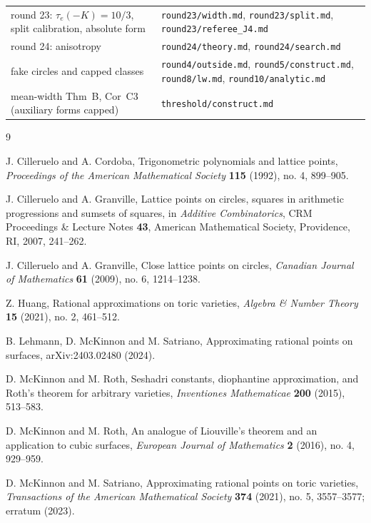 \documentclass[11pt]{article}
\newcommand{\rec}[1]{\texttt{#1}}
\begin{document}
\begin{center}
\begin{tabular}{@{}p{}p{}@{}}
round 23: \(\tau_e(-K)=10/3\), split calibration, absolute form &
  \rec{round23/width.md}, \rec{round23/split.md}, \rec{round23/referee\_J4.md} \\
round 24: anisotropy & \rec{round24/theory.md}, \rec{round24/search.md} \\
fake circles and capped classes &
  \rec{round4/outside.md}, \rec{round5/construct.md}, \rec{round8/lw.md},
  \rec{round10/analytic.md} \\
mean-width Thm~B, Cor~C3 (auxiliary forms capped) &
  \rec{threshold/construct.md} \\
\hline
\end{tabular}
\end{center}

\begin{thebibliography}{9}

J. Cilleruelo and A. Cordoba,
\newblock Trigonometric polynomials and lattice points,
\newblock \emph{Proceedings of the American Mathematical Society}
\textbf{115} (1992), no. 4, 899--905.

J. Cilleruelo and A. Granville,
\newblock Lattice points on circles, squares in arithmetic progressions and
sumsets of squares,
\newblock in \emph{Additive Combinatorics}, CRM Proceedings \& Lecture Notes
\textbf{43}, American Mathematical Society, Providence, RI, 2007, 241--262.

J. Cilleruelo and A. Granville,
\newblock Close lattice points on circles,
\newblock \emph{Canadian Journal of Mathematics} \textbf{61} (2009), no. 6,
1214--1238.

Z. Huang,
\newblock Rational approximations on toric varieties,
\newblock \emph{Algebra \& Number Theory} \textbf{15} (2021), no. 2, 461--512.

B. Lehmann, D. McKinnon and M. Satriano,
\newblock Approximating rational points on surfaces,
\newblock arXiv:2403.02480 (2024).

D. McKinnon and M. Roth,
\newblock Seshadri constants, diophantine approximation, and Roth's theorem
for arbitrary varieties,
\newblock \emph{Inventiones Mathematicae} \textbf{200} (2015), 513--583.

D. McKinnon and M. Roth,
\newblock An analogue of Liouville's theorem and an application to cubic
surfaces,
\newblock \emph{European Journal of Mathematics} \textbf{2} (2016), no. 4,
929--959.

D. McKinnon and M. Satriano,
\newblock Approximating rational points on toric varieties,
\newblock \emph{Transactions of the American Mathematical Society}
\textbf{374} (2021), no. 5, 3557--3577; erratum (2023).

\end{thebibliography}
\end{document}
